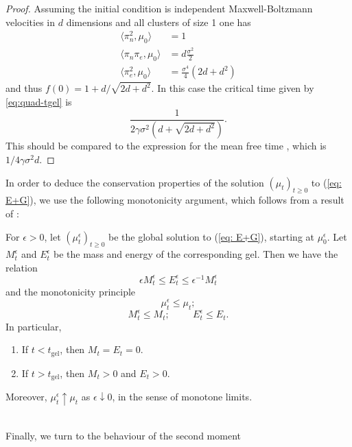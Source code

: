 \begin{proof}
Assuming the initial condition is independent Maxwell-Boltzmann velocities in $d$ dimensions and all clusters of size 1 one has
\begin{align*}
    \langle \pi_n^2, \mu_0\rangle &= 1\\
    \langle \pi_n \pi_e, \mu_0\rangle &= d\frac{\sigma^2}{2}\\
    \langle \pi_e^2, \mu_0\rangle &= \frac{\sigma^4}{4}\left(2d + d^2\right)
\end{align*}
and thus $f(0) = 1 + d / \sqrt{2d + d^2}$.
In this case the critical time given by \eqref{eq:quad-tgel} is
\begin{equation}
    \frac{1}{2\gamma \sigma^2 \left(d + \sqrt{2d +d^2}\right)}.
\end{equation}
This should be compared to the expression for the mean free time \cite[equation 4.38]{PSW17}, which is $1/4\gamma \sigma^2 d$. \end{proof} \fi In order to deduce the conservation properties of the solution $(\mu_t)_{t\geq 0}$ to (\ref{eq: E+G}), we use the following monotonicity argument, which follows from a result of \cite{N00}: \begin{lemma}\label{lemma: connecting mu-epsilon and mu}
    For $\epsilon>0$, let $(\mu^\epsilon_t)_{t\geq 0}$ be the global solution to (\ref{eq: E+G}), starting at $\mu_0^\epsilon.$ Let $M^\epsilon_t$ and $E^\epsilon_t$ be the mass and energy of the corresponding gel. Then we have the relation \begin{equation}
        \epsilon M^\epsilon_t \leq E^\epsilon_t \leq \epsilon^{-1}M^\epsilon_t
    \end{equation} and the monotonicity principle\begin{equation}
        \mu^\epsilon_t \leq \mu_t;
    \end{equation}\begin{equation}
        M^\epsilon_t \leq M_t; \hspace{1cm} E^\epsilon_t \le E_t.
    \end{equation}
 In particular, \begin{enumerate}[label=\roman{*}).]
        \item If $t<t_\mathrm{gel}$, then $M_t=E_t=0$.
        \item If $t>t_\mathrm{gel}$, then $M_t >0$ and $E_t>0$.
    \end{enumerate} Moreover, $\mu^\epsilon_t\uparrow \mu_t$ as $\epsilon\downarrow 0$, in the sense of monotone limits.
\end{lemma}  \medskip \\ Finally, we turn to the behaviour of the second moment
